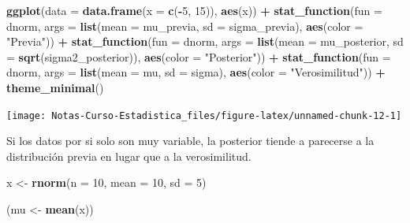 \documentclass[
  12pt,
]{book}
\newenvironment{Shaded}{\begin{snugshade}}{\end{snugshade}}
\newcommand{\DataTypeTok}[1]{\textcolor[rgb]{0.13,0.29,0.53}{#1}}
\newcommand{\DecValTok}[1]{\textcolor[rgb]{0.00,0.00,0.81}{#1}}
\newcommand{\KeywordTok}[1]{\textcolor[rgb]{0.13,0.29,0.53}{\textbf{#1}}}
\newcommand{\NormalTok}[1]{#1}
\newcommand{\OperatorTok}[1]{\textcolor[rgb]{0.81,0.36,0.00}{\textbf{#1}}}
\newcommand{\StringTok}[1]{\textcolor[rgb]{0.31,0.60,0.02}{#1}}
\begin{document}
\begin{Shaded}
\begin{Highlighting}[]
\KeywordTok{ggplot}\NormalTok{(}\DataTypeTok{data =} \KeywordTok{data.frame}\NormalTok{(}\DataTypeTok{x =} \KeywordTok{c}\NormalTok{(}\OperatorTok{{-}}\DecValTok{5}\NormalTok{, }\DecValTok{15}\NormalTok{)), }\KeywordTok{aes}\NormalTok{(x)) }\OperatorTok{+}
\StringTok{  }\KeywordTok{stat\_function}\NormalTok{(}\DataTypeTok{fun =}\NormalTok{ dnorm, }\DataTypeTok{args =} \KeywordTok{list}\NormalTok{(}\DataTypeTok{mean =}\NormalTok{ mu\_previa, }\DataTypeTok{sd =}\NormalTok{ sigma\_previa), }\KeywordTok{aes}\NormalTok{(}\DataTypeTok{color =} \StringTok{"Previa"}\NormalTok{)) }\OperatorTok{+}
\StringTok{  }\KeywordTok{stat\_function}\NormalTok{(}\DataTypeTok{fun =}\NormalTok{ dnorm, }\DataTypeTok{args =} \KeywordTok{list}\NormalTok{(}\DataTypeTok{mean =}\NormalTok{ mu\_posterior, }\DataTypeTok{sd =} \KeywordTok{sqrt}\NormalTok{(sigma2\_posterior)), }\KeywordTok{aes}\NormalTok{(}\DataTypeTok{color =} \StringTok{"Posterior"}\NormalTok{)) }\OperatorTok{+}
\StringTok{  }\KeywordTok{stat\_function}\NormalTok{(}\DataTypeTok{fun =}\NormalTok{ dnorm, }\DataTypeTok{args =} \KeywordTok{list}\NormalTok{(}\DataTypeTok{mean =}\NormalTok{ mu, }\DataTypeTok{sd =}\NormalTok{ sigma), }\KeywordTok{aes}\NormalTok{(}\DataTypeTok{color =} \StringTok{"Verosimilitud"}\NormalTok{)) }\OperatorTok{+}
\StringTok{  }\KeywordTok{theme\_minimal}\NormalTok{()}
\end{Highlighting}
\end{Shaded}

\begin{center}\texttt{[image: Notas-Curso-Estadistica\_files/figure-latex/unnamed-chunk-12-1]} \end{center}

Si los datos por si solo son muy variable, la posterior tiende a parecerse a la
distribución previa en lugar que a la verosimilitud.

\begin{Shaded}
\begin{Highlighting}[]
\NormalTok{x \textless{}{-}}\StringTok{ }\KeywordTok{rnorm}\NormalTok{(}\DataTypeTok{n =} \DecValTok{10}\NormalTok{, }\DataTypeTok{mean =} \DecValTok{10}\NormalTok{, }\DataTypeTok{sd =} \DecValTok{5}\NormalTok{)}

\NormalTok{(mu \textless{}{-}}\StringTok{ }\KeywordTok{mean}\NormalTok{(x))}
\end{Highlighting}
\end{Shaded}
\end{document}
